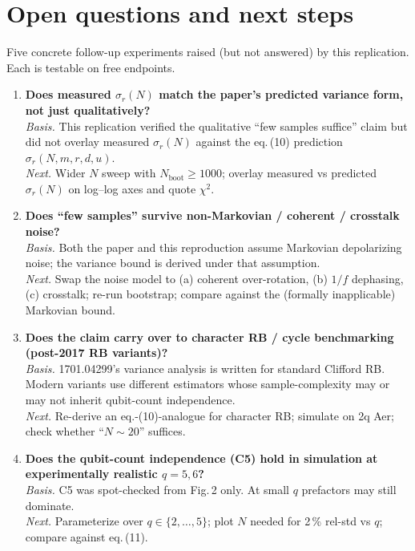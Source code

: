 \section{Open questions and next steps}

Five concrete follow-up experiments raised (but not answered) by this
replication. Each is testable on free endpoints.

\begin{enumerate}
\item \textbf{Does measured $\sigma_r(N)$ match the paper's predicted
  variance form, not just qualitatively?}\\
  \emph{Basis.} This replication verified the qualitative ``few samples
  suffice'' claim but did not overlay measured $\sigma_r(N)$ against the
  eq.\,(10) prediction $\sigma_r(N,m,r,d,u)$.\\
  \emph{Next.} Wider $N$ sweep with $N_\mathrm{boot}\geq 1000$; overlay
  measured vs predicted $\sigma_r(N)$ on log--log axes and quote
  $\chi^2$.

\item \textbf{Does ``few samples'' survive non-Markovian / coherent /
  crosstalk noise?}\\
  \emph{Basis.} Both the paper and this reproduction assume Markovian
  depolarizing noise; the variance bound is derived under that
  assumption.\\
  \emph{Next.} Swap the noise model to (a) coherent over-rotation,
  (b) $1/f$ dephasing, (c) crosstalk; re-run bootstrap; compare against
  the (formally inapplicable) Markovian bound.

\item \textbf{Does the claim carry over to character RB / cycle
  benchmarking (post-2017 RB variants)?}\\
  \emph{Basis.} 1701.04299's variance analysis is written for standard
  Clifford RB. Modern variants use different estimators whose
  sample-complexity may or may not inherit qubit-count independence.\\
  \emph{Next.} Re-derive an eq.-(10)-analogue for character RB; simulate
  on 2q Aer; check whether ``$N\!\sim\!20$'' suffices.

\item \textbf{Does the qubit-count independence (C5) hold in simulation
  at experimentally realistic $q=5,6$?}\\
  \emph{Basis.} C5 was spot-checked from Fig.\,2 only. At small $q$
  prefactors may still dominate.\\
  \emph{Next.} Parameterize over $q\in\{2,\dots,5\}$; plot $N$ needed
  for 2\,\% rel-std vs $q$; compare against eq.\,(11).


\end{enumerate}
